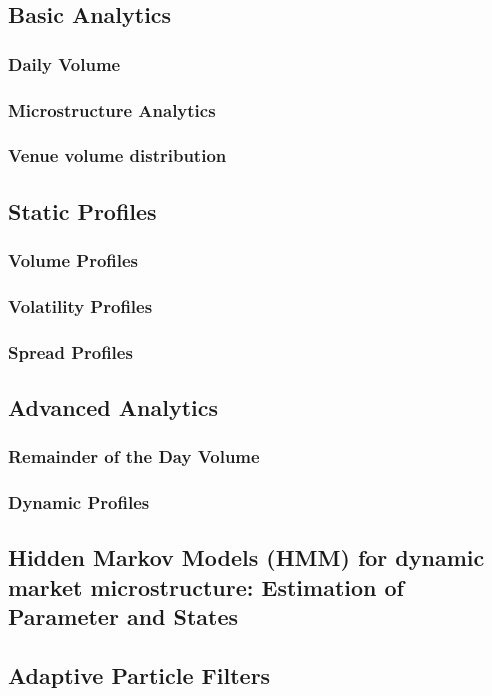 \subsection{Basic Analytics}
\subsubsection{Daily Volume}
\subsubsection{Microstructure Analytics}
\subsubsection{Venue volume distribution}
\subsection{Static Profiles}
\subsubsection{Volume Profiles}
\subsubsection{Volatility Profiles}
\subsubsection{Spread Profiles}

\subsection{Advanced Analytics}
\subsubsection{Remainder of the Day Volume}
\subsubsection{Dynamic Profiles}
\subsection{Hidden Markov Models (HMM) for dynamic market microstructure:  Estimation of Parameter and States}
\subsection{Adaptive Particle Filters}

